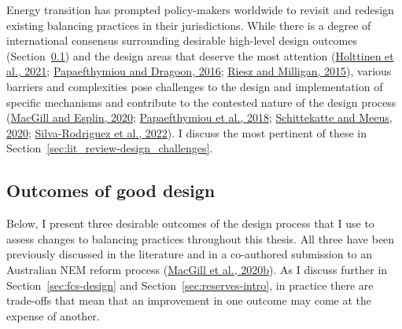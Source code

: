 \documentclass[12pt,a4paper,]{report}
\begin{document}
Energy transition has prompted policy-makers worldwide to revisit and
redesign existing balancing practices in their jurisdictions. While
there is a degree of international consensus surrounding desirable
high-level design outcomes
(Section~\ref{sec:lit_review-design_outcomes}) and the design areas that
deserve the most attention
(\protect\hyperlink{ref-holttinenDesignOperationEnergy2021}{Holttinen et
al., 2021};
\protect\hyperlink{ref-papaefthymiou100RenewableEnergy2016}{Papaefthymiou
and Dragoon, 2016};
\protect\hyperlink{ref-rieszDesigningElectricityMarkets2015}{Riesz and
Milligan, 2015}), various barriers and complexities pose challenges to
the design and implementation of specific mechanisms and contribute to
the contested nature of the design process
(\protect\hyperlink{ref-macgillEndtoendElectricityMarket2020}{MacGill
and Esplin, 2020};
\protect\hyperlink{ref-papaefthymiouPowerSystemFlexibility2018}{Papaefthymiou
et al., 2018};
\protect\hyperlink{ref-schittekatteFlexibilityMarketsProject2020}{Schittekatte
and Meeus, 2020};
\protect\hyperlink{ref-silva-rodriguezShortTermWholesale2022}{Silva-Rodriguez
et al., 2022}). I discuss the most pertinent of these in
Section~\ref{sec:lit_review-design_challenges}.

\hypertarget{sec:lit_review-design_outcomes}{%
\subsection{Outcomes of good
design}\label{sec:lit_review-design_outcomes}}

Below, I present three desirable outcomes of the design process that I
use to assess changes to balancing practices throughout this thesis. All
three have been previously discussed in the literature and in a
co-authored submission to an Australian NEM reform process
(\protect\hyperlink{ref-macgillResponseEnergySecurity2020}{MacGill et
al., 2020b}). As I discuss further in Section~\ref{sec:fcs-design} and
Section~\ref{sec:reserves-intro}, in practice there are trade-offs that
mean that an improvement in one outcome may come at the expense of
another.
\end{document}

